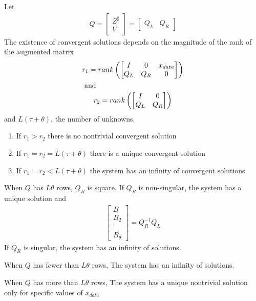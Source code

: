 \documentclass[12pt]{article}
\begin{document}
\begin{thrm}
  
Let
\begin{gather*}
  Q= 
  \begin{bmatrix}
    Z^{\sharp}\\V
  \end{bmatrix}
= 
  \begin{bmatrix}
    Q_L&Q_R
  \end{bmatrix}
\end{gather*}
The existence of convergent solutions depends on the magnitude of the
rank of the augmented
matrix 
\begin{gather*}
r_1=rank \left (  
\begin{bmatrix}
    I&0&x_{data}\\
Q_L&Q_R&0
  \end{bmatrix} 
\right ) 
\\ 
\intertext{ and  }
r_2=rank \left (  \begin{bmatrix}
    I&0\\
Q_L&Q_R
  \end{bmatrix} \right )
\end{gather*}
and  $L(\tau+\theta)$, the number of unknowns.


\begin{enumerate}
\item If $r_1 > r_2$ there is no nontrivial convergent solution
\item If $r_1 = r_2 = L(\tau + \theta)$ there is a unique convergent solution
\item If $r_1 = r_2 < L(\tau + \theta)$ the system has an infinity of convergent 
solutions
\end{enumerate}

\end{thrm}


\begin{crrlry}
  When $Q$ has $L \theta$ rows, $Q_R$ is square.
If  $Q_R$ is non-singular, the system has a unique solution and
\begin{gather*}
    \begin{bmatrix}
    B\\B_2\\ \vdots \\ B_{\theta}  
  \end{bmatrix}
= Q_R^{-1} Q_L
\end{gather*}
  If $Q_R$ is singular, the system has an infinity of solutions.
\end{crrlry}
\begin{crrlry}
  When $Q$ has fewer than $L \theta$ rows,
The system has an infinity of solutions.
\end{crrlry}
\begin{crrlry}
  When $Q$ has more than $L \theta$ rows,
The system has a unique nontrivial 
solution only for specific values of $x_{data}$
\end{crrlry}
\end{document}
